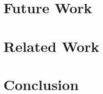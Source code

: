 \documentclass[10pt]{sigplanconf}
\begin{document}
\section{Future Work}


\section{Related Work}


\section{Conclusion}


\acks








%

{


}

\end{document}

